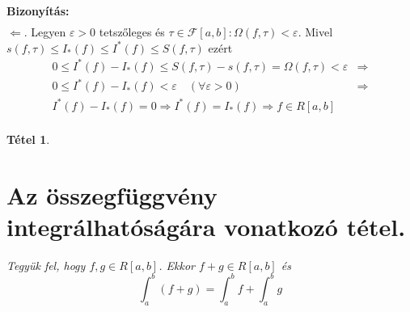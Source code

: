 \documentclass{article}
\newtheorem{theorem}{Tétel}
\renewenvironment{proof}{\textbf{Bizonyítás:} \\}{\hfill}
\begin{document}
\begin{proof}
\begin{equation*}
\begin{split}
\end{split}
\end{equation*}
$\boxed{\Longleftarrow}$. Legyen $\varepsilon > 0$ tetszőleges és $\tau \in \mathcal{F}[a,b]: \Omega(f,\tau)<\varepsilon$. Mivel $s(f,\tau)\leq I_*(f)\leq I^*(f)\leq S(f,\tau)$ ezért
\begin{equation*}
\begin{split}
    0\leq I^*(f)-I_*(f)\leq S(f,\tau)-s(f,\tau)=\Omega(f,\tau)<\varepsilon & \Longrightarrow \\
    0 \leq I^*(f)-I_*(f)<\varepsilon\quad (\forall \varepsilon > 0)& \Longrightarrow \\
    I^*(f) -I_*(f) = 0\Longrightarrow I^*(f)=I_*(f) \Longrightarrow f\in R[a,b] & \\
\end{split}
\end{equation*}
\end{proof}
\newpage
\begin{theorem}
\section{Az összegfüggvény integrálhatóságára vonatkozó tétel.} 
Tegyük fel, hogy $f,g\in R[a,b]$. Ekkor $f+g\in R[a,b]$ és
\begin{equation*}
    \int_a^b(f+g)=\int_a^bf+\int_a^bg
\end{equation*}
\end{theorem}
\end{document}
